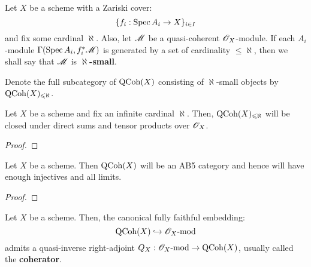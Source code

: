         \begin{definition} \label{def: small_quasi_coherent_modules}
            Let $X$ be a scheme with a Zariski cover:
                $$\{f_i: \operatorname{Spec} A_i \to X\}_{i \in I}$$
            and fix some cardinal $\aleph$. Also, let $\mathscr{M}$ be a quasi-coherent $\mathscr{O}_X$-module. If each $A_i$-module $\Gamma(\operatorname{Spec} A_i, f_i^*\mathscr{M})$ is generated by a set of cardinality $\leq \aleph$, then we shall say that $\mathscr{M}$ is \textbf{$\aleph$-small}. 

            Denote the full subcategory of $\mathrm{QCoh}(X)$ consisting of $\aleph$-small objects by $\mathrm{QCoh}(X)_{\leqslant \aleph}$.
        \end{definition}
        \begin{lemma} \label{lemma: closure_properties_of_small_quasi_coherent_modules}
            Let $X$ be a scheme and fix an infinite cardinal $\aleph$. Then, $\mathrm{QCoh}(X)_{\leqslant \aleph}$ will be closed under direct sums and tensor products over $\mathscr{O}_X$.
        \end{lemma}
            \begin{proof}
                
            \end{proof}
        \begin{theorem} \label{theorem: qcoh_homological_properties}
            Let $X$ be a scheme. Then $\mathrm{QCoh}(X)$ will be an AB5 category and hence will have enough injectives and all limits. 
        \end{theorem}
            \begin{proof}
                
            \end{proof}
        \begin{corollary}
            Let $X$ be a scheme. Then, the canonical fully faithful embedding:
                $$\mathrm{QCoh}(X) \hookrightarrow \mathscr{O}_X\text{-}\mathrm{mod}$$
            admits a quasi-inverse right-adjoint $Q_X: \mathscr{O}_X\text{-}\mathrm{mod} \to \mathrm{QCoh}(X)$, usually called the \textbf{coherator}.
        \end{corollary}
        
